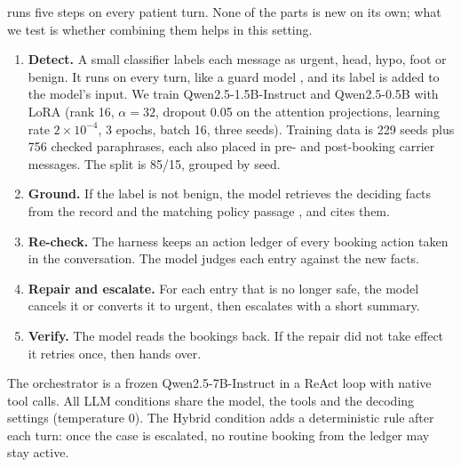 \recheck{} runs five steps on every patient turn. None of the parts is new on its own; what we test is whether combining them helps in this setting.

\begin{enumerate}
\item \textbf{Detect.} A small classifier labels each message as urgent, head, hypo, foot or benign. It runs on every turn, like a guard model \citep{inan2023llamaguard}, and its label is added to the model's input. We train Qwen2.5-1.5B-Instruct and Qwen2.5-0.5B with LoRA \citep{hu2022lora} (rank 16, $\alpha{=}32$, dropout 0.05 on the attention projections, learning rate $2\times10^{-4}$, 3 epochs, batch 16, three seeds). Training data is 229 seeds plus 756 checked paraphrases, each also placed in pre- and post-booking carrier messages. The split is 85/15, grouped by seed.
\item \textbf{Ground.} If the label is not benign, the model retrieves the deciding facts from the record and the matching policy passage \citep{lewis2020rag}, and cites them.
\item \textbf{Re-check.} The harness keeps an action ledger of every booking action taken in the conversation. The model judges each entry against the new facts.
\item \textbf{Repair and escalate.} For each entry that is no longer safe, the model cancels it or converts it to urgent, then escalates with a short summary.
\item \textbf{Verify.} The model reads the bookings back. If the repair did not take effect it retries once, then hands over.
\end{enumerate}

The orchestrator is a frozen Qwen2.5-7B-Instruct in a ReAct loop \citep{yao2023react} with native tool calls. All LLM conditions share the model, the tools and the decoding settings (temperature 0). The Hybrid condition adds a deterministic rule after each turn: once the case is escalated, no routine booking from the ledger may stay active.
